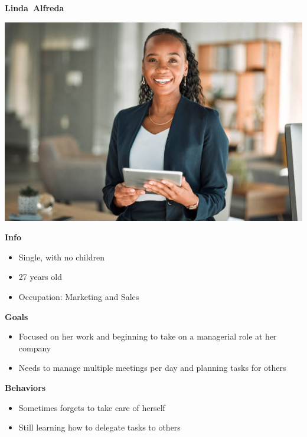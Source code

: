 \textbf{Linda~Alfreda}

\includegraphics{../common/personas/res/Linda.jpg}

\textbf{Info}
\begin{itemize}
  \item Single, with no children
  \item 27 years old
  \item Occupation: Marketing and Sales
\end{itemize}

\textbf{Goals}
\begin{itemize}
  \item Focused on her work and beginning to take on a managerial role at her company
  \item Needs to manage multiple meetings per day and planning tasks for others
\end{itemize}

\textbf{Behaviors}
\begin{itemize}
  \item Sometimes forgets to take care of herself
  \item Still learning how to delegate tasks to others
\end{itemize}

